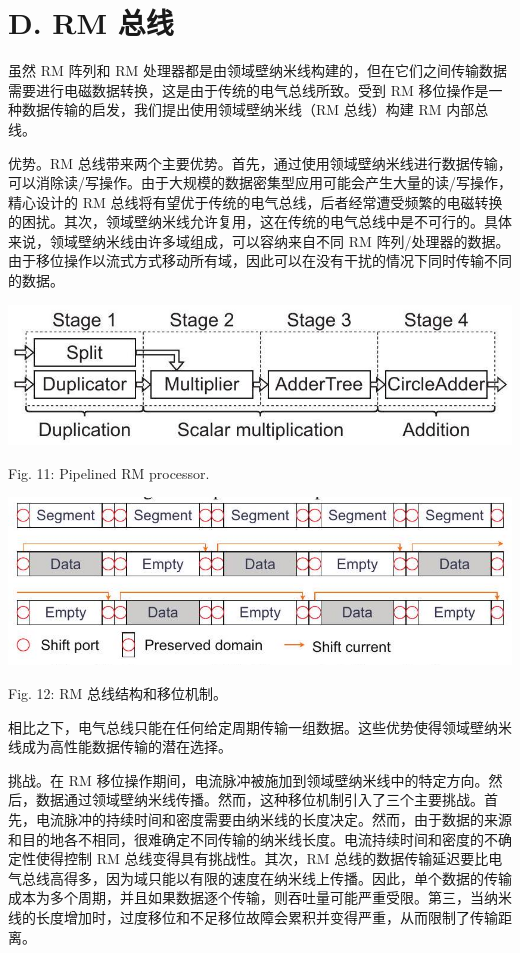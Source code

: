 \documentclass[10pt]{article}
\begin{document}
\section*{D. RM 总线}

虽然 RM 阵列和 RM 处理器都是由领域壁纳米线构建的，但在它们之间传输数据需要进行电磁数据转换，这是由于传统的电气总线所致。受到 RM 移位操作是一种数据传输的启发，我们提出使用领域壁纳米线（RM 总线）构建 RM 内部总线。

优势。RM 总线带来两个主要优势。首先，通过使用领域壁纳米线进行数据传输，可以消除读/写操作。由于大规模的数据密集型应用可能会产生大量的读/写操作，精心设计的 RM 总线将有望优于传统的电气总线，后者经常遭受频繁的电磁转换的困扰。其次，领域壁纳米线允许复用，这在传统的电气总线中是不可行的。具体来说，领域壁纳米线由许多域组成，可以容纳来自不同 RM 阵列/处理器的数据。由于移位操作以流式方式移动所有域，因此可以在没有干扰的情况下同时传输不同的数据。

\begin{center}
\includegraphics[max width=\textwidth]{2024_05_12_abeba8a85da5b5ec4c7bg-06}
\end{center}

Fig. 11: Pipelined RM processor.

\begin{center}
\includegraphics[max width=\textwidth]{2024_05_12_abeba8a85da5b5ec4c7bg-06(2)}
\end{center}

Fig. 12: RM 总线结构和移位机制。

相比之下，电气总线只能在任何给定周期传输一组数据。这些优势使得领域壁纳米线成为高性能数据传输的潜在选择。

挑战。在 RM 移位操作期间，电流脉冲被施加到领域壁纳米线中的特定方向。然后，数据通过领域壁纳米线传播。然而，这种移位机制引入了三个主要挑战。首先，电流脉冲的持续时间和密度需要由纳米线的长度决定。然而，由于数据的来源和目的地各不相同，很难确定不同传输的纳米线长度。电流持续时间和密度的不确定性使得控制 RM 总线变得具有挑战性。其次，RM 总线的数据传输延迟要比电气总线高得多，因为域只能以有限的速度在纳米线上传播。因此，单个数据的传输成本为多个周期，并且如果数据逐个传输，则吞吐量可能严重受限。第三，当纳米线的长度增加时，过度移位和不足移位故障会累积并变得严重，从而限制了传输距离。
\end{document}
